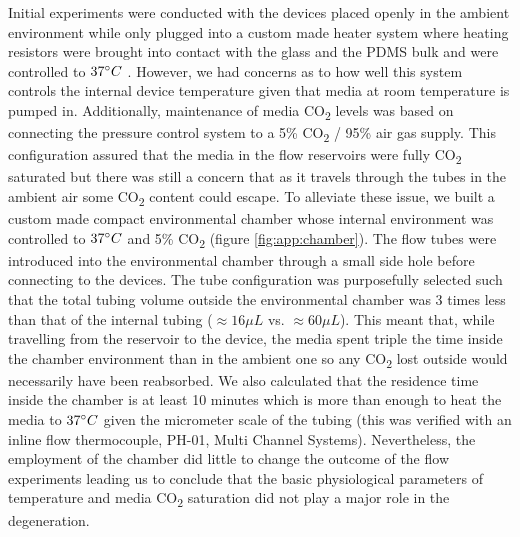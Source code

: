     Initial experiments were conducted with the devices placed openly in the ambient environment while only plugged into a custom made heater system where heating resistors were brought into contact with the glass and the PDMS bulk and were controlled to \(37\degree C\) \cite{johnstoneThesis}. However, we had concerns as to how well this system controls the internal device temperature given that media at room temperature is pumped in. Additionally, maintenance of media CO\textsubscript{2} levels was based on connecting the pressure control system to a 5\% CO\textsubscript{2} / 95\% air gas supply. This configuration assured that the media in the flow reservoirs were fully CO\textsubscript{2} saturated but there was still a concern that as it travels through the tubes in the ambient air some CO\textsubscript{2} content could escape. To alleviate these issue, we built a custom made compact environmental chamber whose internal environment was controlled to \(37\degree C\) and 5\% CO\textsubscript{2} (figure \ref{fig:app:chamber}). The flow tubes were introduced into the environmental chamber through a small side hole before connecting to the devices. The tube configuration was purposefully selected such that the total tubing volume outside the environmental chamber was 3 times less than that of the internal tubing (\(\approx 16 \mu L\) vs. \(\approx 60\mu L\)). This meant that, while travelling from the reservoir to the device, the media spent triple the time inside the chamber environment than in the ambient one so any CO\textsubscript{2} lost outside would necessarily have been reabsorbed. We also calculated that the residence time inside the chamber is at least 10 minutes which is more than enough to heat the media to \(37\degree C\) given the micrometer scale of the tubing (this was verified with an inline flow thermocouple, PH-01, Multi Channel Systems). Nevertheless, the employment of the chamber did little to change the outcome of the flow experiments leading us to conclude that the basic physiological parameters of temperature and media CO\textsubscript{2} saturation did not play a major role in the degeneration.

